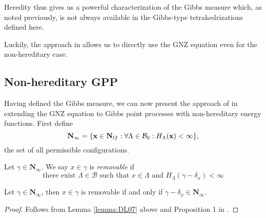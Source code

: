 Heredity thus gives us a powerful characterization of the Gibbs measure which, as noted previously, is not always available in the Gibbs-type tetrahedrizations defined here. 
 

Luckily, the approach in \cite{DereudreLavancier2009} allows us to directly use the GNZ equation even for the non-hereditary case. 

% 
% 
% 


\subsection{Non-hereditary GPP}\label{sec:non-hereditary}
Having defined the Gibbs measure, we can now present the approach of \cite{DereudreLavancier2009} in extending the GNZ equation to Gibbs point processes with non-hereditary energy functions. First define 
$$\mathbf N_\infty = \{{\mathbf{x}} \in \mathbf N_{lf}: \forall \Lambda \in \mathcal B_0: H_\Lambda({\mathbf{x}})< \infty\},$$
the set of all permissible configurations.

\begin{definition}\label{def:removable}
	Let $\gamma \in \mathbf N_\infty$. We say $x\in\gamma$ is \textit{removable} if 
	$$\text{there exist } \Lambda \in \mathcal B \text{ such that } x\in\Lambda \text{ and } H_\Lambda(\gamma - \delta_x)<\infty$$
\end{definition}




\begin{proposition}
	Let $\gamma \in \mathbf N_\infty$, then $x\in\gamma$ is removable if and only if $\gamma - \delta_x \in \mathbf N_\infty$.
\end{proposition}
\begin{proof}
	Follows from Lemma \ref{lemma:DL07} above and Proposition 1 in \cite{DereudreLavancier2009}.	
\end{proof}


